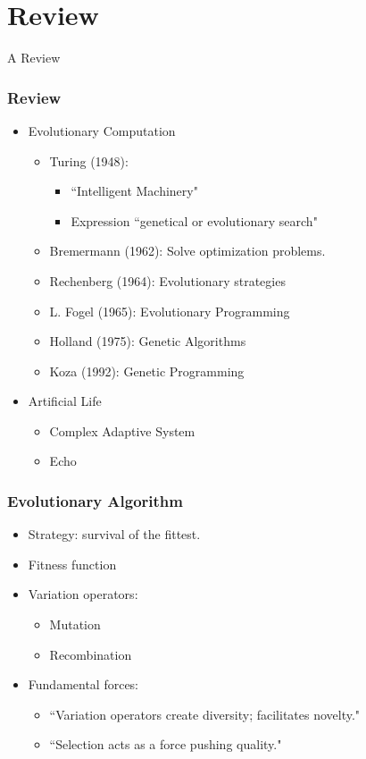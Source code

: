 \section{Review}

\frame
{
	\begin{center}
		\LARGE A Review
	\end{center}
}

\frame
{
	\frametitle{Review}
	
	\begin{itemize}
		\item Evolutionary Computation
			\begin{itemize}
				\item Turing (1948):
					\begin{itemize}
						\item ``Intelligent Machinery"
						\item Expression ``genetical or evolutionary search"
					\end{itemize}
				\item Bremermann (1962): Solve optimization problems.
				\item Rechenberg (1964): Evolutionary strategies
				\item L. Fogel (1965): Evolutionary Programming
				\item Holland (1975): Genetic Algorithms
				\item Koza (1992): Genetic Programming				
			\end{itemize}
		\item Artificial Life
			\begin{itemize}
				\item Complex Adaptive System
				\item Echo
			\end{itemize}
	\end{itemize}
}

\frame
{
	\frametitle{Evolutionary Algorithm}

	\begin{itemize}
		\item Strategy: survival of the fittest.
		\item Fitness function
		\item Variation operators:
			\begin{itemize}
				\item Mutation
				\item Recombination
			\end{itemize}
		\item Fundamental forces:
			\begin{itemize}
					\item ``Variation operators create diversity; facilitates novelty."
					\item ``Selection acts as a force pushing quality."
			\end{itemize}
	\end{itemize}
}


